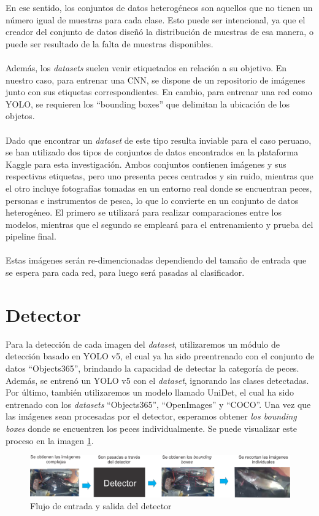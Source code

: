 En ese sentido, los conjuntos de datos heterogéneos son aquellos que no tienen un número igual de muestras para cada clase. Esto puede ser intencional, ya que el creador del conjunto de datos diseñó la distribución de muestras de esa manera, o puede ser resultado de la falta de muestras disponibles.
\\\\
Además, los \textit{datasets} suelen venir etiquetados en relación a su objetivo. En nuestro caso, para entrenar una CNN, se dispone de un repositorio de imágenes junto con sus etiquetas correspondientes. En cambio, para entrenar una red como YOLO, se requieren los ``bounding boxes'' que delimitan la ubicación de los objetos.
\\\\
Dado que encontrar un \textit{dataset} de este tipo resulta inviable para el caso peruano, se han utilizado dos tipos de conjuntos de datos encontrados en la plataforma Kaggle para esta investigación. Ambos conjuntos contienen imágenes y sus respectivas etiquetas, pero uno presenta peces centrados y sin ruido, mientras que el otro incluye fotografías tomadas en un entorno real donde se encuentran peces, personas e instrumentos de pesca, lo que lo convierte en un conjunto de datos heterogéneo. El primero se utilizará para realizar comparaciones entre los modelos, mientras que el segundo se empleará para el entrenamiento y prueba del pipeline final.
\\\\
Estas imágenes serán re-dimencionadas dependiendo del tamaño de entrada que se espera para cada red, para luego será pasadas al clasificador.

\section{Detector}
Para la detección de cada imagen del \textit{dataset}, utilizaremos un módulo de detección basado en YOLO v5, el cual ya ha sido preentrenado con el conjunto de datos ``Objects365'', brindando la capacidad de detectar la categoría de peces. Además, se entrenó un YOLO v5 con el \textit{dataset}, ignorando las clases detectadas. Por último, también utilizaremos un modelo llamado UniDet, el cual ha sido entrenado con los \textit{datasets} ``Objects365'', ``OpenImages'' y ``COCO''.  Una vez que las imágenes sean procesadas por el detector, esperamos obtener \textit{los bounding boxes} donde se encuentren los peces individualmente. Se puede visualizar este proceso en la imagen \ref{fig:detector_pez}.
\begin{figure}[h!]
\includegraphics[width=1\textwidth]{images/detector_pez.png}
\caption{Flujo de entrada y salida del detector }
\label{fig:detector_pez}
\end{figure}



